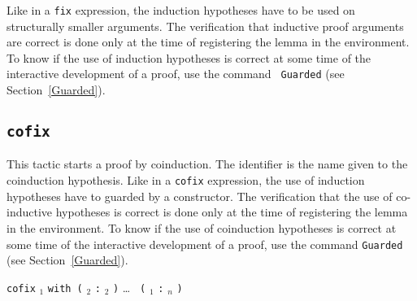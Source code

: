 \begin{coq_example*}
Like in a {\tt fix} expression, the induction
hypotheses have to be used on structurally smaller arguments.
The verification that inductive proof arguments are correct is done
only at the time of registering the lemma in the environment. To know
if the use of induction hypotheses is correct at some
time of the interactive development of a proof, use the command {\tt
  Guarded} (see Section~\ref{Guarded}).


\subsection{\tt cofix \ident}
\label{tactic:cofix}

This tactic starts a proof by coinduction. The identifier {\ident} is
the name given to the coinduction hypothesis.  Like in a {\tt cofix}
expression, the use of induction hypotheses have to guarded by a
constructor.  The verification that the use of co-inductive hypotheses
is correct is done only at the time of registering the lemma in the
environment. To know if the use of coinduction hypotheses is correct
at some time of the interactive development of a proof, use the
command {\tt Guarded} (see Section~\ref{Guarded}).


\begin{Variants}
  \item {\tt cofix} {\ident}$_1$ {\tt with (} {\ident}$_2$
     {\tt :} {\type}$_2$ {\tt )} {\ldots} {\tt
      (} {\ident}$_1$  {\tt :} {\type}$_n$
           {\tt )}


\end{Variants}
\end{coq_example*}
